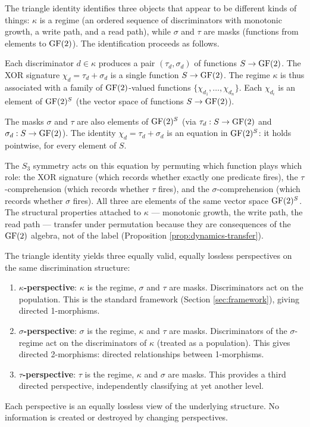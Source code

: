 \begin{remark}
\label{rem:triangle-grounding}
The triangle identity identifies three objects that
appear to be different kinds of things: $\kappa$ is a
regime (an ordered sequence of discriminators with
monotonic growth, a write path, and a read path), while
$\sigma$ and $\tau$ are masks (functions from elements
to $\operatorname{GF}(2)$). The identification proceeds as follows.

Each discriminator $d \in \kappa$ produces a pair
$(\tau_d, \sigma_d)$ of functions $S \to \operatorname{GF}(2)$. The
XOR signature $\chi_d = \tau_d + \sigma_d$ is a single
function $S \to \operatorname{GF}(2)$. The regime $\kappa$ is thus
associated with a family of $\operatorname{GF}(2)$-valued functions
$\{\chi_{d_1}, \ldots, \chi_{d_n}\}$. Each $\chi_{d_i}$
is an element of $\operatorname{GF}(2)^S$ (the vector space of
functions $S \to \operatorname{GF}(2)$).

The masks $\sigma$ and $\tau$ are also elements of
$\operatorname{GF}(2)^S$ (via $\tau_d: S \to \operatorname{GF}(2)$ and
$\sigma_d: S \to \operatorname{GF}(2)$). The identity
$\chi_d = \tau_d + \sigma_d$ is an equation in
$\operatorname{GF}(2)^S$: it holds pointwise, for every element
of $S$.

The $S_3$ symmetry acts on this equation by permuting
which function plays which role: the XOR signature (which
records whether exactly one predicate fires), the
$\tau$-comprehension (which records whether $\tau$ fires),
and the $\sigma$-comprehension (which records whether
$\sigma$ fires). All three are elements of the
same vector space $\operatorname{GF}(2)^S$. The structural properties
attached to $\kappa$ --- monotonic growth, the write path,
the read path --- transfer under permutation because they
are consequences of the $\operatorname{GF}(2)$ algebra, not of the
label (Proposition \ref{prop:dynamics-transfer}).
\end{remark}

\begin{proposition}\label{prop:perspectives}
The triangle identity yields three equally valid, equally
lossless perspectives on the same discrimination structure:
\begin{enumerate}[label=(\roman*),nosep]
  \item \textbf{$\kappa$-perspective}: $\kappa$ is the
    regime, $\sigma$ and $\tau$ are masks.
    Discriminators act on the population. This is the
    standard framework (Section \ref{sec:framework}),
    giving directed 1-morphisms.
  \item \textbf{$\sigma$-perspective}: $\sigma$ is the
    regime, $\kappa$ and $\tau$ are masks.
    Discriminators of the $\sigma$-regime act on the
    discriminators of $\kappa$ (treated as a population).
    This gives directed 2-morphisms: directed
    relationships between 1-morphisms.
  \item \textbf{$\tau$-perspective}: $\tau$ is the regime,
    $\kappa$ and $\sigma$ are masks.
    This provides a third directed perspective,
    independently classifying at yet another level.
\end{enumerate}
Each perspective is an equally lossless view of the
underlying structure. No information is created or
destroyed by changing perspectives.
\end{proposition}

